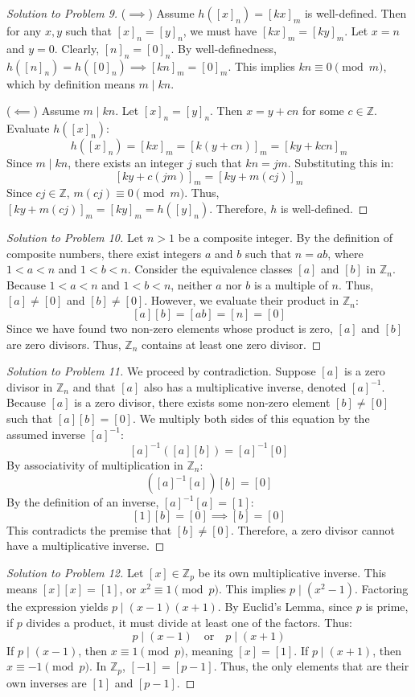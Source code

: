 \documentclass[11pt, a4paper]{article}
\theoremstyle{definition}
\theoremstyle{remark}
\newcommand{\Z}{\mathbb{Z}}
\begin{document}
\begin{proof}[Solution to Problem 9]
($\implies$) Assume $h([x]_n) = [kx]_m$ is well-defined. Then for any $x, y$ such that $[x]_n = [y]_n$, we must have $[kx]_m = [ky]_m$. 
Let $x = n$ and $y = 0$. Clearly, $[n]_n = [0]_n$. 
By well-definedness, $h([n]_n) = h([0]_n) \implies [kn]_m = [0]_m$. 
This implies $kn \equiv 0 \pmod m$, which by definition means $m \mid kn$.

($\impliedby$) Assume $m \mid kn$. Let $[x]_n = [y]_n$. Then $x = y + cn$ for some $c \in \Z$.
Evaluate $h([x]_n)$:
\[ h([x]_n) = [kx]_m = [k(y + cn)]_m = [ky + kcn]_m \]
Since $m \mid kn$, there exists an integer $j$ such that $kn = jm$. Substituting this in:
\[ [ky + c(jm)]_m = [ky + m(cj)]_m \]
Since $cj \in \Z$, $m(cj) \equiv 0 \pmod m$. Thus, $[ky + m(cj)]_m = [ky]_m = h([y]_n)$. Therefore, $h$ is well-defined.
\end{proof}

\begin{proof}[Solution to Problem 10]
Let $n > 1$ be a composite integer. By the definition of composite numbers, there exist integers $a$ and $b$ such that $n = ab$, where $1 < a < n$ and $1 < b < n$.
Consider the equivalence classes $[a]$ and $[b]$ in $\Z_n$. Because $1 < a < n$ and $1 < b < n$, neither $a$ nor $b$ is a multiple of $n$. Thus, $[a] \neq [0]$ and $[b] \neq [0]$.
However, we evaluate their product in $\Z_n$:
\[ [a][b] = [ab] = [n] = [0] \]
Since we have found two non-zero elements whose product is zero, $[a]$ and $[b]$ are zero divisors. Thus, $\Z_n$ contains at least one zero divisor.
\end{proof}

\begin{proof}[Solution to Problem 11]
We proceed by contradiction. Suppose $[a]$ is a zero divisor in $\Z_n$ and that $[a]$ also has a multiplicative inverse, denoted $[a]^{-1}$.
Because $[a]$ is a zero divisor, there exists some non-zero element $[b] \neq [0]$ such that $[a][b] = [0]$.
We multiply both sides of this equation by the assumed inverse $[a]^{-1}$:
\[ [a]^{-1}([a][b]) = [a]^{-1}[0] \]
By associativity of multiplication in $\Z_n$:
\[ ([a]^{-1}[a])[b] = [0] \]
By the definition of an inverse, $[a]^{-1}[a] = [1]$:
\[ [1][b] = [0] \implies [b] = [0] \]
This contradicts the premise that $[b] \neq [0]$. Therefore, a zero divisor cannot have a multiplicative inverse.
\end{proof}

\begin{proof}[Solution to Problem 12]
Let $[x] \in \Z_p$ be its own multiplicative inverse. This means $[x][x] = [1]$, or $x^2 \equiv 1 \pmod p$.
This implies $p \mid (x^2 - 1)$. Factoring the expression yields $p \mid (x - 1)(x + 1)$.
By Euclid's Lemma, since $p$ is prime, if $p$ divides a product, it must divide at least one of the factors. Thus:
\[ p \mid (x - 1) \quad \text{or} \quad p \mid (x + 1) \]
If $p \mid (x - 1)$, then $x \equiv 1 \pmod p$, meaning $[x] = [1]$.
If $p \mid (x + 1)$, then $x \equiv -1 \pmod p$. In $\Z_p$, $[-1] = [p - 1]$.
Thus, the only elements that are their own inverses are $[1]$ and $[p-1]$.
\end{proof}
\end{document}
